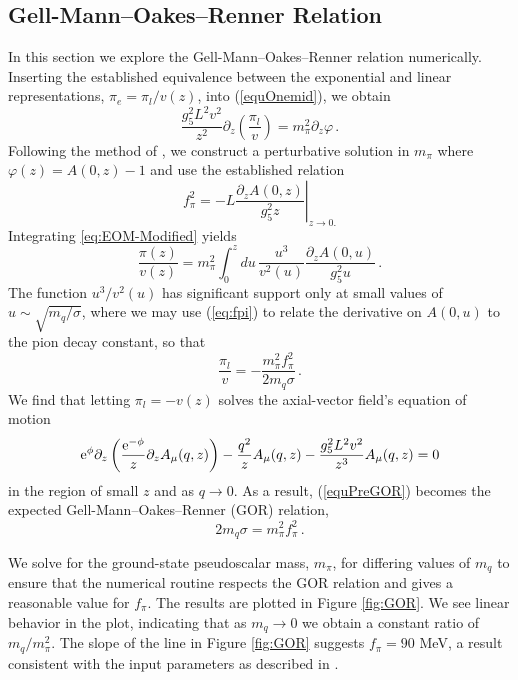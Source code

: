 \subsection{Gell-Mann--Oakes--Renner Relation}

In this section we explore the Gell-Mann--Oakes--Renner relation numerically.
Inserting the established equivalence between the exponential and linear representations, $\pi_{e}=\pi_{l}/v(z)$, into (\ref{equOnemid}), we obtain 
\begin{equation}
\frac{g_{5}^{2}L^{2}v^{2}}{z^{2}}\partial_{z}\left(\frac{\pi_{l}}{v}\right)=m_{\pi}^{2}\partial_{z}\varphi\,.\label{eq:EOM-Modified}
\end{equation}
 Following the method of \cite{stephanov-katz-son}, we construct a perturbative solution in $m_{\pi}$ where $\varphi(z)=A(0,z)-1$ and use the established relation
\begin{equation}
f_{\pi}^{2}=-\left.L\frac{\partial_{z}A(0,z)}{g_{5}^{2}z}\right|_{z\rightarrow0.}\label{eq:fpi}
\end{equation}
Integrating \eqref{eq:EOM-Modified} yields 
\begin{equation}
\frac{\pi(z)}{v(z)}=m_{\pi}^{2}\int_{0}^{z}du\,\frac{u^{3}}{v^{2}(u)}\frac{\partial_{z}A(0,u)}{g_{5}^{2}u}\,.
\end{equation}
The function $u^{3}/v^{2}(u)$ has significant support only at small values of $u\sim\sqrt{m_{q}/\sigma}$, where we may use (\ref{eq:fpi}) to relate the derivative on $A(0,u)$ to the pion decay constant, so that 
\begin{equation}
\frac{\pi_{l}}{v}=-\frac{m_{\pi}^{2}f_{\pi}^{2}}{2m_{q}\sigma}\,.\label{equPreGOR}
\end{equation}
We find that letting $\pi_{l}=-v(z)$ solves the axial-vector field's equation of motion 
\begin{equation}
{\rm e}^{\phi}\partial_{z}\left(\frac{{\rm e}^{-\phi}}{z}\partial_{z}A_{\mu}(q,z)\right)-\frac{q^{2}}{z}A_{\mu}(q,z)-\frac{g_{5}^{2}L^{2}v^{2}}{z^{3}}A_{\mu}(q,z)=0
\end{equation}
 in the region of small $z$ and as $q\rightarrow0$. 
 As a result, (\ref{equPreGOR}) becomes the expected Gell-Mann--Oakes--Renner (GOR)
relation, 
\begin{equation}
2m_{q}\sigma=m_{\pi}^{2}f_{\pi}^{2}\,.\label{eq:GOR}
\end{equation}

We solve for the ground-state pseudoscalar mass, $m_{\pi}$, for
differing values of $m_{q}$ to ensure that the numerical routine
respects the GOR relation and gives a reasonable value for $f_{\pi}$.
The results are plotted in Figure \ref{fig:GOR}. We see linear behavior
in the plot, indicating that as $m_{q}\rightarrow0$ we obtain a constant
ratio of $m_{q}/m_{\pi}^{2}$. The slope of the line in Figure \ref{fig:GOR}
suggests $f_{\pi}=90$ MeV, a result consistent with the input parameters
as described in \cite{gherghetta-kelley}.

